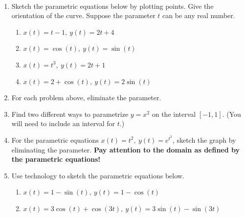 \documentclass[11pt]{amsart}
\newcommand{\ds}{\displaystyle}
\begin{document}
\begin{center}
  \large
  \\
   
\end{center}

\begin{enumerate}
\item Sketch the parametric equations below by plotting points. Give the orientation of the curve. Suppose the parameter $t$ can be any real number.
	\begin{enumerate}
	\item $\ds x(t)= t-1, \: y(t) = 2t+4 $
	\vfill
	\item $\ds x(t)= \cos(t), \: y(t) = \sin(t)$
	\vfill
	\item $\ds x(t)= t^3, \: y(t) = 2t+1$
	\vfill
\newpage
	\item $\ds x(t)= 2+\cos(t), \: y(t) = 2\sin(t) $
	\vfill
	\end{enumerate}
\item For each problem above, eliminate the parameter.

\item Find two different ways to parametrize $y=x^2$ on the interval $[-1,1].$ (You will need to include an interval for $t$.)
\vspace{1in}
\item For the parametric equations $\ds x(t)= t^2, \: y(t) = e^{t^2}$, sketch the graph by eliminating the parameter. \textbf{Pay attention to the domain as defined by the parametric equations!}
\vfill
\item Use technology to sketch the parametric equations below.
	\begin{enumerate}
	\item $\ds x(t)= 1-\sin(t), \: y(t) = 1-\cos(t)$\\
	
	\item $\ds x(t)= 3\cos(t)+\cos(3t), \: y(t) = 3\sin(t)-\sin(3t) $\\
	
	\end{enumerate}
\end{enumerate}
\end{document}
